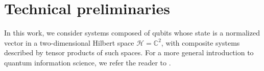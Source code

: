 \documentclass[a4paper,twocolumn,11pt,unpublished]{quantumarticle}
\newcommand{\Hilbert}{\mathcal H}
\begin{document}



\appendix

\section{Technical preliminaries}
\label{sec:prelim}
In this work, we consider systems composed of qubits whose state is a normalized vector in a two-dimensional Hilbert space $\Hilbert = \mathbb C ^2$, with composite systems described by tensor products of such spaces. For a more general introduction to quantum information science, we refer the reader to \cite{NC00quantum}.




\end{document}

